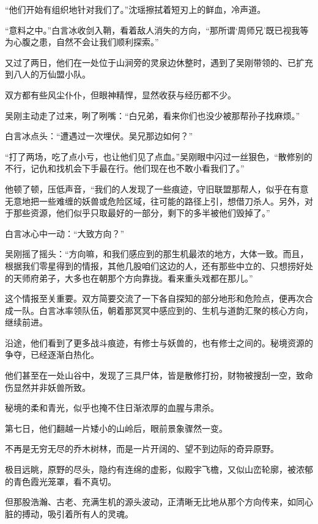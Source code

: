 “他们开始有组织地针对我们了。”沈瑶擦拭着短刃上的鲜血，冷声道。

“意料之中。”白言冰收剑入鞘，看着敌人消失的方向，“那所谓‘周师兄’既已视我等为心腹之患，自然不会让我们顺利探索。”

\vspace{2em}

又过了两日，他们在一处位于山涧旁的灵泉边休整时，遇到了吴刚带领的、已扩充到八人的万仙盟小队。

双方都有些风尘仆仆，但眼神精悍，显然收获与经历都不少。

吴刚主动走了过来，咧了咧嘴：“白兄弟，看来你们也没少被那帮孙子找麻烦。”

白言冰点头：“遭遇过一次埋伏。吴兄那边如何？”

“打了两场，吃了点小亏，也让他们见了点血。”吴刚眼中闪过一丝狠色，“散修别的不行，记仇和找机会下手最在行。他们现在也不敢小看我们了。”

他顿了顿，压低声音，“我们的人发现了一些痕迹，守旧联盟那帮人，似乎在有意无意地把一些难缠的妖兽或危险区域，往可能的路径上引，想借刀杀人。另外，对于那些资源，他们似乎只取最好的一部分，剩下的多半被他们毁掉了。”

白言冰心中一动：“大致方向？”

吴刚摇了摇头：“方向嘛，和我们感应到的那生机最浓的地方，大体一致。而且，根据我们零星得到的情报，其他几股咱们这边的人，还有那些中立的、只想捞好处的天师府弟子，大多也在朝那个方向靠拢。看来重头戏都在那儿。”

这个情报至关重要。双方简要交流了一下各自探知的部分地形和危险点，便再次合成一队。白言冰率领队伍，朝着那冥冥中感应到的、生机与道韵汇聚的核心方向，继续前进。

沿途，他们看到了更多战斗痕迹，有修士与妖兽的，也有修士之间的。秘境资源的争夺，已经逐渐白热化。

他们甚至在一处山谷中，发现了三具尸体，皆是散修打扮，财物被搜刮一空，致命伤显然并非妖兽所致。

秘境的柔和青光，似乎也掩不住日渐浓厚的血腥与肃杀。

\vspace{2em}

第七日，他们翻越一片矮小的山岭后，眼前景象骤然一变。

不再是无穷无尽的乔木树林，而是一片开阔的、望不到边际的奇异原野。

极目远眺，原野的尽头，隐约有连绵的虚影，似殿宇飞檐，又似山峦轮廓，被浓郁的青色霞光笼罩，看不真切。

但那股浩瀚、古老、充满生机的源头波动，正清晰无比地从那个方向传来，如同心脏的搏动，吸引着所有人的灵魂。


